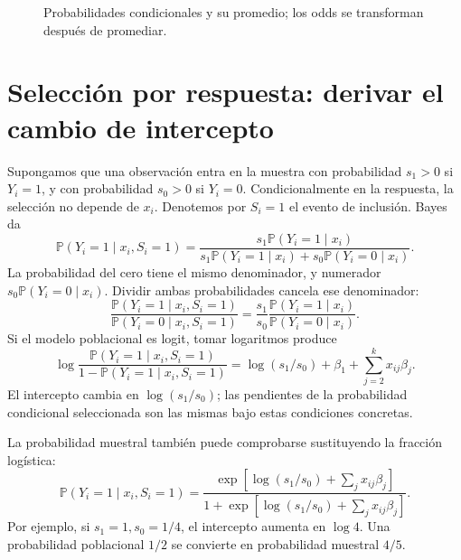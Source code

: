 \documentclass[11pt,a4paper]{article}
\newcommand{\Prob}{\mathbb P}
\begin{document}
\begin{figure}[H]\centering
{}
\caption{Probabilidades condicionales y su promedio; los odds se transforman después de promediar.}
\end{figure}

\clearpage
\section{Selección por respuesta: derivar el cambio de intercepto}\label{logit80}
Supongamos que una observación entra en la muestra con
probabilidad \(s_1>0\) si \(Y_i=1\), y con probabilidad
\(s_0>0\) si \(Y_i=0\). Condicionalmente en la respuesta,
la selección no depende de \(x_i\).
Denotemos por \(S_i=1\) el evento de inclusión.
Bayes da
\[
\Prob(Y_i=1\mid x_i,S_i=1)
=\frac{s_1\Prob(Y_i=1\mid x_i)}
{s_1\Prob(Y_i=1\mid x_i)+s_0\Prob(Y_i=0\mid x_i)}.
\]
La probabilidad del cero tiene el mismo denominador,
y numerador \(s_0\Prob(Y_i=0\mid x_i)\).
Dividir ambas probabilidades cancela ese denominador:
\[
\frac{\Prob(Y_i=1\mid x_i,S_i=1)}
{\Prob(Y_i=0\mid x_i,S_i=1)}
=\frac{s_1}{s_0}
\frac{\Prob(Y_i=1\mid x_i)}{\Prob(Y_i=0\mid x_i)}.
\]
Si el modelo poblacional es logit, tomar logaritmos produce
\[
\log\frac{\Prob(Y_i=1\mid x_i,S_i=1)}
{1-\Prob(Y_i=1\mid x_i,S_i=1)}
=\log(s_1/s_0)+\beta_1+\sum_{j=2}^k x_{ij}\beta_j.
\]
El intercepto cambia en \(\log(s_1/s_0)\);
las pendientes de la probabilidad condicional seleccionada
son las mismas bajo estas condiciones concretas.

La probabilidad muestral también puede comprobarse
sustituyendo la fracción logística:
\[
\Prob(Y_i=1\mid x_i,S_i=1)
=\frac{\exp[\log(s_1/s_0)+\sum_jx_{ij}\beta_j]}
{1+\exp[\log(s_1/s_0)+\sum_jx_{ij}\beta_j]}.
\]
Por ejemplo, si \(s_1=1,s_0=1/4\), el intercepto
aumenta en \(\log4\).
Una probabilidad poblacional \(1/2\) se convierte
en probabilidad muestral \(4/5\).
\end{document}
